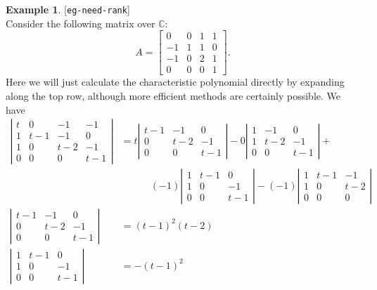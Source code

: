 \documentclass{amsart}
\newcommand{\lbl}[1]{\label{#1}\textup{[\texttt{#1}]}\ \\}
\newcommand{\lbl}{\label}
\newcommand{\bbm}       {\left[\begin{matrix}}
\newcommand{\ebm}       {\end{matrix}\right]}
\newcommand{\C}         {{\mathbb{C}}}
\renewcommand{\:}{\colon}
\theoremstyle{definition}
\newtheorem{example}[theorem]{Example}
\begin{document}
\begin{example}\lbl{eg-need-rank}
 Consider the following matrix over $\C$:
 \[ A = \bbm 0  & 0 & 1 & 1 \\
             -1 & 1 & 1 & 0 \\
             -1 & 0 & 2 & 1 \\
             0  & 0 & 0 & 1 \ebm.
 \]
 Here we will just calculate the characteristic polynomial directly by
 expanding along the top row, although more efficient methods are
 certainly possible.  We have
 \begin{align*}
  \left| \begin{array}{cccc}
   t & 0 & -1 & -1 \\ 
   1 & t-1 & -1 & 0 \\
   1 & 0 & t-2 & -1 \\
   0 & 0 & 0 & t-1 
  \end{array} \right| &=
  t \left|\begin{array}{ccc}
     t-1&-1&0\\0&t-2&-1\\0&0&t-1
    \end{array}\right| -
  0 \left|\begin{array}{ccc}
     1&-1&0\\ 1&t-2&-1 \\ 0&0&t-1 
    \end{array}\right| + \\
  & \hspace{3em}
  (-1)\left|\begin{array}{ccc}
     1&t-1&0\\ 1&0&-1 \\ 0&0&t-1 
    \end{array}\right| -
  (-1)\left|\begin{array}{ccc}
     1&t-1&-1\\ 1&0&t-2 \\ 0&0&0 
    \end{array}\right|  \\
    \left|\begin{array}{ccc}
     t-1&-1&0\\0&t-2&-1\\0&0&t-1
    \end{array}\right| &= (t-1)^2(t-2) \\
    \left|\begin{array}{ccc}
     1&t-1&0\\ 1&0&-1 \\ 0&0&t-1 
    \end{array}\right| &= -(t-1)^2 \\

\end{align*}
\end{example}
\end{document}
